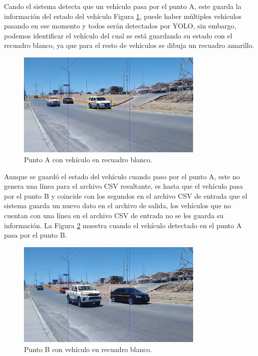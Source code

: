 Cando el sistema detecta que un vehículo pasa por el punto A, este guarda la información del estado del vehículo Figura \ref{fig:PuntoA}, puede haber múltiples vehículos pasando en ese momento y todos serán detectados por YOLO, sin embargo, podemos identificar el vehículo del cual se está guardando su estado con el recuadro blanco, ya que para el resto de vehículos se dibuja un recuadro amarillo.

\begin{figure}[H]
    \centering
    \includegraphics[width=0.8\textwidth]{Metodologia/imgs/Punto_A.jpg}
    \caption{Punto A con vehículo en recuadro blanco.}
    \label{fig:PuntoA}
\end{figure}

Aunque se guardó el estado del vehículo cuando paso por el punto A, este no genera una línea para el archivo CSV resultante, es hasta que el vehículo pasa por el punto B y coincide con los segundos en el archivo CSV de entrada que el sistema guarda un nuevo dato en el archivo de salida, los vehículos que no cuentan con una línea en el archivo CSV de entrada no se les guarda su información. La Figura \ref{fig:PuntoB} muestra cuando el vehículo detectado en el punto A pasa por el punto B.

\begin{figure}[H]
    \centering
    \includegraphics[width=0.8\textwidth]{Metodologia/imgs/Punto_B.jpg}
    \caption{Punto B con vehículo en recuadro blanco.}
    \label{fig:PuntoB}
\end{figure}

